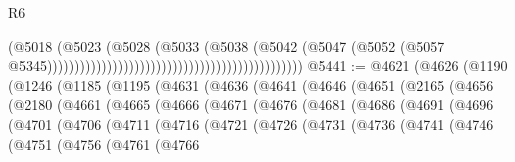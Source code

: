 \begin{lexlean}{R6}
\begin{coremodule}
                                                                                (@5018
                                                                                  (@5023
                                                                                    (@5028
                                                                                      (@5033
                                                                                        (@5038
                                                                                          (@5042
                                                                                            (@5047
                                                                                              (@5052
                                                                                                (@5057
                                                                                                  @5345)))))))))))))))))))))))))))))))))))))))))))))))
@5441 := @4621
    (@4626
      (@1190
        (@1246
          (@1185
            (@1195
              (@4631
                (@4636
                  (@4641
                    (@4646
                      (@4651
                        (@2165
                          (@4656
                            (@2180
                              (@4661
                                (@4665
                                  (@4666
                                    (@4671
                                      (@4676
                                        (@4681
                                          (@4686
                                            (@4691
                                              (@4696
                                                (@4701
                                                  (@4706
                                                    (@4711
                                                      (@4716
                                                        (@4721
                                                          (@4726
                                                            (@4731
                                                              (@4736
                                                                (@4741
                                                                  (@4746
                                                                    (@4751
                                                                      (@4756
                                                                        (@4761
                                                                          (@4766

\end{coremodule}
\end{lexlean}
